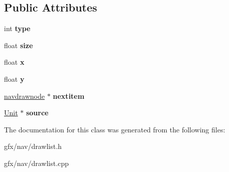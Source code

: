 \subsection*{Public Attributes}
\begin{DoxyCompactItemize}
\item 
int {\bfseries type}\hypertarget{classnavdrawnode_adec879df90b29001bc8eaa0a4e8f3563}{}\label{classnavdrawnode_adec879df90b29001bc8eaa0a4e8f3563}

\item 
float {\bfseries size}\hypertarget{classnavdrawnode_a7e61acf3926ab019e776d22f0a09ca2a}{}\label{classnavdrawnode_a7e61acf3926ab019e776d22f0a09ca2a}

\item 
float {\bfseries x}\hypertarget{classnavdrawnode_ab51130d828014b14a6ed19dc417e7320}{}\label{classnavdrawnode_ab51130d828014b14a6ed19dc417e7320}

\item 
float {\bfseries y}\hypertarget{classnavdrawnode_ad91ab3f4f4f53250d22ca08325b27c54}{}\label{classnavdrawnode_ad91ab3f4f4f53250d22ca08325b27c54}

\item 
\hyperlink{classnavdrawnode}{navdrawnode} $\ast$ {\bfseries nextitem}\hypertarget{classnavdrawnode_aa804938bf612bf402a56570f784c1f71}{}\label{classnavdrawnode_aa804938bf612bf402a56570f784c1f71}

\item 
\hyperlink{classUnit}{Unit} $\ast$ {\bfseries source}\hypertarget{classnavdrawnode_ae7b13b55df2a619885e21efed5977b26}{}\label{classnavdrawnode_ae7b13b55df2a619885e21efed5977b26}

\end{DoxyCompactItemize}


The documentation for this class was generated from the following files\+:\begin{DoxyCompactItemize}
\item 
gfx/nav/drawlist.\+h\item 
gfx/nav/drawlist.\+cpp\end{DoxyCompactItemize}
